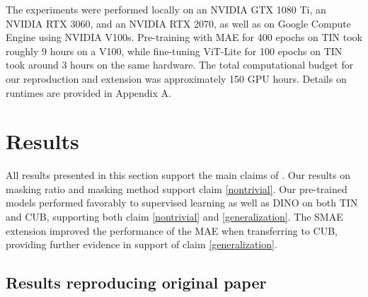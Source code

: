 The experiments were performed locally on an NVIDIA GTX 1080 Ti, an NVIDIA RTX 3060, and an NVIDIA RTX 2070, as well as on Google Compute Engine using NVIDIA V100s. Pre-training with MAE for 400 epochs on TIN took roughly 9 hours on a V100, while fine-tuning ViT-Lite for 100 epochs on TIN took around 3 hours on the same hardware. The total computational budget for our reproduction and extension was approximately 150 GPU hours. Details on runtimes are provided in Appendix A.

\section{Results}
\label{sec:results}
All results presented in this section support the main claims of \cite{mae}. Our results on masking ratio and masking method support claim \ref{nontrivial}. Our pre-trained models performed favorably to supervised learning as well as DINO on both TIN and CUB, supporting both claim \ref{nontrivial} and \ref{generalization}. The SMAE extension improved the performance of the MAE when transferring to CUB, providing further evidence in support of claim \ref{generalization}.

\subsection{Results reproducing original paper}



